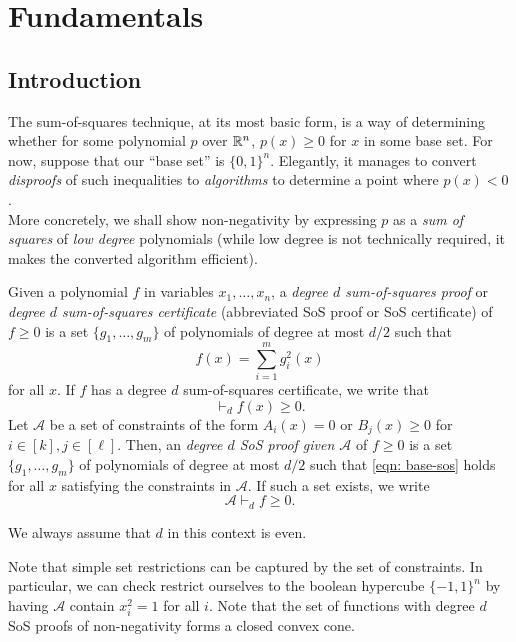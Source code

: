 
\section{Fundamentals}

\subsection{Introduction}

	The sum-of-squares technique, at its most basic form, is a way of determining whether for some polynomial $p$ over $\mathbb{R}^n$, $p(x) \ge 0$ for $x$ in some base set. For now, suppose that our ``base set'' is $\{0,1\}^n$. Elegantly, it manages to convert \emph{disproofs} of such inequalities to \emph{algorithms} to determine a point where $p(x) < 0$. \\
	More concretely, we shall show non-negativity by expressing $p$ as a \emph{sum of squares} of \emph{low degree} polynomials (while low degree is not technically required, it makes the converted algorithm efficient).
	\begin{fdef}
		Given a polynomial $f$ in variables $x_1,\ldots,x_n$, a \emph{degree $d$ sum-of-squares proof} or \emph{degree $d$ sum-of-squares certificate} (abbreviated SoS proof or SoS certificate) of $f \ge 0$ is a set $\{g_1,\ldots,g_m\}$ of polynomials of degree at most $d/2$ such that
		\begin{equation}
			\label{eqn: base-sos}
			f(x) = \sum_{i=1}^m g_i^2(x)
		\end{equation}
		for all $x$.
		If $f$ has a degree $d$ sum-of-squares certificate, we write that
		\[ \vdash_d f(x) \ge 0. \]
		Let $\mathcal{A}$ be a set of constraints of the form $A_i(x) = 0$ or $B_j(x) \ge 0$ for $i \in [k], j \in [\ell]$. Then, an \emph{degree $d$ SoS proof given $\mathcal{A}$} of $f \ge 0$ is a set $\{g_1,\ldots,g_m\}$ of polynomials of degree at most $d/2$ such that \eqref{eqn: base-sos} holds for all $x$ satisfying the constraints in $\mathcal{A}$. If such a set exists, we write
		\[ \mathcal{A} \vdash_d f \ge 0. \]
	\end{fdef}
	We always assume that $d$ in this context is even.

	Note that simple set restrictions can be captured by the set of constraints. In particular, we can check restrict ourselves to the boolean hypercube $\{-1,1\}^n$ by having $\mathcal{A}$ contain $x_i^2 = 1$ for all $i$. 
	Note that the set of functions with degree $d$ SoS proofs of non-negativity forms a closed convex cone.

